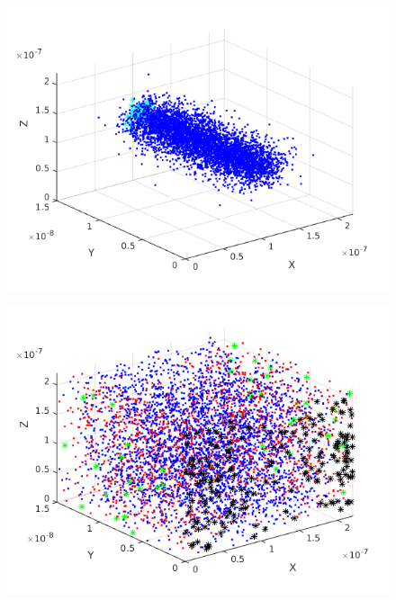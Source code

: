 \documentclass[screen]{beamer}
\begin{document}
\begin{frame}
\begin{columns}
\begin{column}{.5\linewidth}
\begin{figure}
  		\includegraphics[scale=0.25]{sim02}
  		\end{figure}
  		\begin{figure}
  		\includegraphics[scale=0.25]{sim04}
  		\end{figure}
    \end{column}
  \end{columns}
\end{frame}
\end{document}
